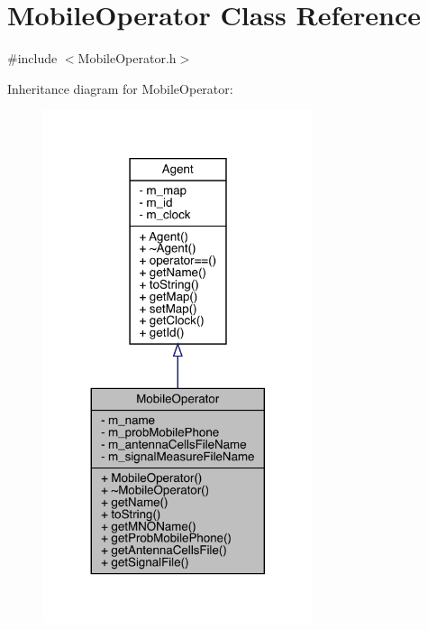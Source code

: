 \hypertarget{class_mobile_operator}{}\section{Mobile\+Operator Class Reference}
\label{class_mobile_operator}


{\ttfamily \#include $<$Mobile\+Operator.\+h$>$}



Inheritance diagram for Mobile\+Operator\+:\nopagebreak
\begin{figure}[H]
\begin{center}
\leavevmode
\includegraphics[width=224pt]{class_mobile_operator__inherit__graph}
\end{center}
\end{figure}


